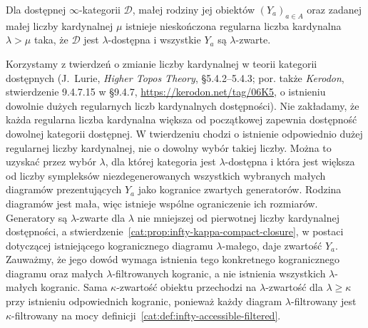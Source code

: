\begin{twierdzenie}\label{cat:thm:infty-accessible-cardinal-enlargement}
Dla dostępnej $\infty$-kategorii $\mathcal D$, małej rodziny jej obiektów $(Y_a)_{a\in A}$ oraz zadanej małej liczby kardynalnej $\mu$ istnieje nieskończona regularna liczba kardynalna $\lambda>\mu$ taka, że $\mathcal D$ jest $\lambda$-dostępna i wszystkie $Y_a$ są $\lambda$-zwarte.
\end{twierdzenie}

Korzystamy z twierdzeń o zmianie liczby kardynalnej w teorii kategorii dostępnych (J.~Lurie, \emph{Higher Topos Theory}, \S5.4.2--5.4.3; por. także \emph{Kerodon}, stwierdzenie 9.4.7.15 w \S9.4.7, \url{https://kerodon.net/tag/06K5}, o istnieniu dowolnie dużych regularnych liczb kardynalnych dostępności). Nie zakładamy, że każda regularna liczba kardynalna większa od początkowej zapewnia dostępność dowolnej kategorii dostępnej. W twierdzeniu chodzi o istnienie odpowiednio dużej regularnej liczby kardynalnej, nie o dowolny wybór takiej liczby. Można to uzyskać przez wybór $\lambda$, dla której kategoria jest $\lambda$-dostępna i która jest większa od liczby sympleksów niezdegenerowanych wszystkich wybranych małych diagramów prezentujących $Y_a$ jako kogranice zwartych generatorów. Rodzina diagramów jest mała, więc istnieje wspólne ograniczenie ich rozmiarów. Generatory są $\lambda$-zwarte dla $\lambda$ nie mniejszej od pierwotnej liczby kardynalnej dostępności, a stwierdzenie~\ref{cat:prop:infty-kappa-compact-closure}, w postaci dotyczącej istniejącego kogranicznego diagramu $\lambda$-małego, daje zwartość $Y_a$. Zauważmy, że jego dowód wymaga istnienia tego konkretnego kogranicznego diagramu oraz małych $\lambda$-filtrowanych kogranic, a nie istnienia wszystkich $\lambda$-małych kogranic. Sama $\kappa$-zwartość obiektu przechodzi na $\lambda$-zwartość dla $\lambda\geq\kappa$ przy istnieniu odpowiednich kogranic, ponieważ każdy diagram $\lambda$-filtrowany jest $\kappa$-filtrowany na mocy definicji~\ref{cat:def:infty-accessible-filtered}.

